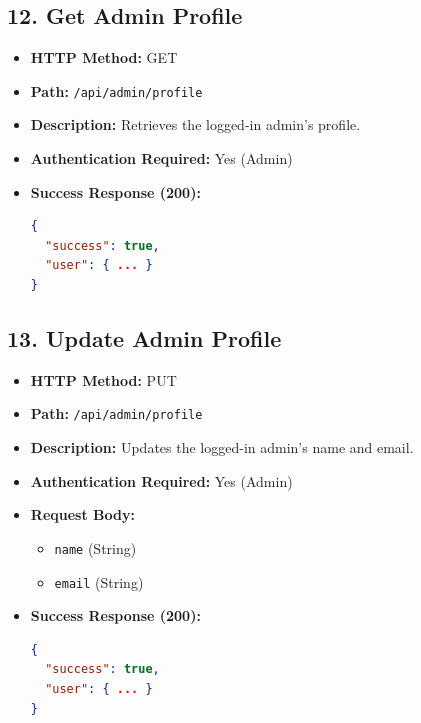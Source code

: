 \documentclass[12pt,a4paper]{article}
\begin{document}
\subsection{12. Get Admin Profile}
\begin{itemize}
    \item \textbf{HTTP Method:} GET
    \item \textbf{Path:} \texttt{/api/admin/profile}
    \item \textbf{Description:} Retrieves the logged-in admin's profile.
    \item \textbf{Authentication Required:} Yes (Admin)
    \item \textbf{Success Response (200):}
\begin{lstlisting}[language=json]
{
  "success": true,
  "user": { ... }
}
\end{lstlisting}
\end{itemize}

\subsection{13. Update Admin Profile}
\begin{itemize}
    \item \textbf{HTTP Method:} PUT
    \item \textbf{Path:} \texttt{/api/admin/profile}
    \item \textbf{Description:} Updates the logged-in admin's name and email.
    \item \textbf{Authentication Required:} Yes (Admin)
    \item \textbf{Request Body:}
    \begin{itemize}
        \item \texttt{name} (String)
        \item \texttt{email} (String)
    \end{itemize}
    \item \textbf{Success Response (200):}
\begin{lstlisting}[language=json]
{
  "success": true,
  "user": { ... }
}
\end{lstlisting}
\end{itemize}
\end{document}
